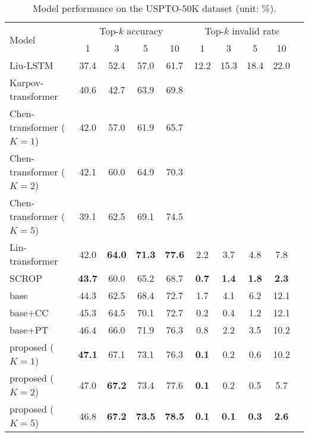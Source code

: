 \documentclass[journal=jacsat,manuscript=article]{achemso}
\begin{document}
	
	\begin{table*}
		\caption{\label{tab:uspto} Model performance on the USPTO-50K dataset (unit: \%).}
		\centering
		\small
		\begin{tabular}{@{\extracolsep{4pt}}lccccccccc@{}}
			\toprule
			\multirow{2}{*}{Model} & \multicolumn{4}{c}{Top-$k$ accuracy} & \multicolumn{4}{c}{Top-$k$ invalid rate} \\ 
			\cline{2-5} \cline{6-9}
			& \multicolumn{1}{c}{1} & \multicolumn{1}{c}{3} & \multicolumn{1}{c}{5} & \multicolumn{1}{c}{10} & \multicolumn{1}{c}{1} & \multicolumn{1}{c}{3} & \multicolumn{1}{c}{5} & \multicolumn{1}{c}{10} \\ 
			\midrule\midrule
			Liu-LSTM \cite{liu2017retrosynthetic} & 37.4 & 52.4 & 57.0 & 61.7 & 12.2 & 15.3 & 18.4 & 22.0  \\
			Karpov-transformer \cite{karpov2019transformer} & 40.6 & 42.7 & 63.9 & 69.8 & ~ & ~ & ~ & ~ \\
			Chen-transformer ($K=1$) \cite{chen2019learning} & 42.0 & 57.0 & 61.9 & 65.7 & ~ & ~ & ~ & ~  \\
			Chen-transformer ($K=2$) \cite{chen2019learning} & 42.1 & 60.0 & 64.9 & 70.3 & ~ & ~ & ~ & ~  \\
			Chen-transformer ($K=5$) \cite{chen2019learning} & 39.1 & 62.5 & 69.1 & 74.5 & ~ & ~ & ~ & ~ \\
			Lin-transformer \cite{lin2020automatic} & 42.0 & \textbf{64.0} & \textbf{71.3} & \textbf{77.6} & 2.2 & 3.7 & 4.8 & 7.8 \\
			SCROP \cite{zheng2019predicting} & \textbf{43.7} & 60.0 & 65.2 & 68.7 & \textbf{0.7} & \textbf{1.4} & \textbf{1.8} & \textbf{2.3} \\
			\midrule
			base & 44.3 & 62.5 & 68.4 & 72.7 & 1.7 & 4.1 & 6.2 & 12.1\\ 
			base+CC & 45.3 & 64.5 & 70.1 & 72.7 & 0.2 & 0.4 & 1.2 & 12.1\\ 
			base+PT & 46.4 & 66.0 & 71.9 & 76.3 & 0.8 & 2.2 & 3.5 & 10.2\\ 
			proposed ($K=1$) & \textbf{47.1} & 67.1 & 73.1 & 76.3 & \textbf{0.1} & 0.2 & 0.6 & 10.2\\ 
			proposed ($K=2$) & 47.0 & \textbf{67.2} & 73.4 & 77.6 & \textbf{0.1} & 0.2 & 0.5 & 5.7\\ 
			proposed ($K=5$) & 46.8 & \textbf{67.2} & \textbf{73.5} & \textbf{78.5} & \textbf{0.1} & \textbf{0.1} & \textbf{0.3} & \textbf{2.6}\\ 
			\bottomrule
		\end{tabular}
	\end{table*}
	
\end{document}
